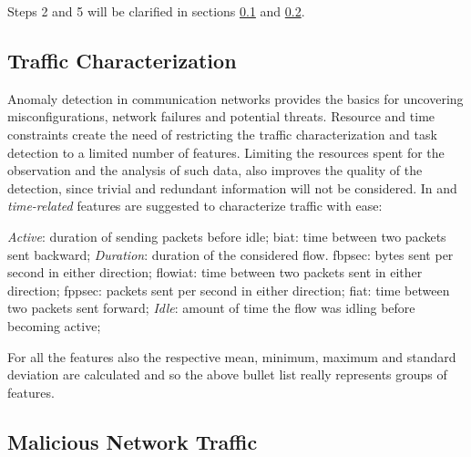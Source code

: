 \noindent Steps 2 and 5 will be clarified in sections \ref{subsec:traffic-characterization} and \ref{subsec:malicious-traffic}.



\subsection{Traffic Characterization}
\label{subsec:traffic-characterization}

Anomaly detection in communication networks provides the basics for uncovering misconfigurations, network failures and potential threats. Resource and time constraints create the need of restricting the traffic characterization and task detection to a limited number of features. Limiting the resources spent for the observation and the analysis of such data, also improves the quality of the detection, since trivial and redundant information will not be considered. In \cite{icissp17} and \cite{icissp18} \textit{time-related} features are suggested to characterize traffic with ease:
\begin{itemize}
    \itemAR \textit{Active}: duration of sending packets before idle;
    \itemAR \gls{biat}: time between two packets sent backward;
    \itemAR \textit{Duration}: duration of the considered flow.
    \itemAR \gls{fbpsec}: bytes sent per second in either direction;
    \itemAR \gls{flowiat}: time between two packets sent in either direction; 
    \itemAR \gls{fppsec}: packets sent per second in either direction;
    \itemAR \gls{fiat}: time between two packets sent forward; 
    \itemAR \textit{Idle}: amount of time the flow was idling before becoming active;
\end{itemize}
For all the features also the respective mean, minimum, maximum and standard deviation are calculated and so the above bullet list really represents groups of features.


\subsection{Malicious Network Traffic}
\label{subsec:malicious-traffic}

